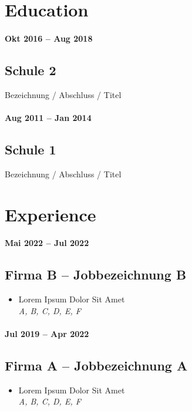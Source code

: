 \section{Education}

\paragraph{Okt 2016 -- Aug 2018}
\subsection{Schule 2}
Bezeichnung / Abschluss / Titel

\paragraph{Aug 2011 -- Jan 2014}
\subsection{Schule 1}
Bezeichnung / Abschluss / Titel

\section{Experience}

\paragraph{Mai 2022 -- Jul 2022}
\subsection{Firma B -- Jobbezeichnung B}
\begin{itemize}
    \item Lorem Ipsum Dolor Sit Amet \\
    \textit{A, B, C, D, E, F}
\end{itemize}

\paragraph{Jul 2019 -- Apr 2022}
\subsection{Firma A -- Jobbezeichnung A}
\begin{itemize}
    \item Lorem Ipsum Dolor Sit Amet \\
    \textit{A, B, C, D, E, F}
\end{itemize}

